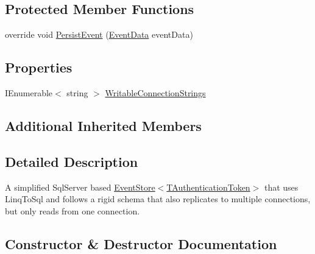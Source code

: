 \subsection*{Protected Member Functions}
\begin{DoxyCompactItemize}
\item 
override void \hyperlink{classCqrs_1_1Sql_1_1Events_1_1ReplicatedSqlEventStore_a51c9b1329327e456a251aa2d910fc7ae}{Persist\+Event} (\hyperlink{classCqrs_1_1Events_1_1EventData}{Event\+Data} event\+Data)
\end{DoxyCompactItemize}
\subsection*{Properties}
\begin{DoxyCompactItemize}
\item 
I\+Enumerable$<$ string $>$ \hyperlink{classCqrs_1_1Sql_1_1Events_1_1ReplicatedSqlEventStore_af7275b09a11b2c7da447019636a5e0f9}{Writable\+Connection\+Strings}
\end{DoxyCompactItemize}
\subsection*{Additional Inherited Members}


\subsection{Detailed Description}
A simplified Sql\+Server based \hyperlink{classCqrs_1_1Events_1_1EventStore_a6346cb2aea4c5b4e740dc6cfb15abab8}{Event\+Store$<$\+T\+Authentication\+Token$>$} that uses Linq\+To\+Sql and follows a rigid schema that also replicates to multiple connections, but only reads from one connection. 



\subsection{Constructor \& Destructor Documentation}
\mbox{\label{classCqrs_1_1Sql_1_1Events_1_1ReplicatedSqlEventStore_aa00d17e2b147ebf7d2aff5ef1a543c07}} 
